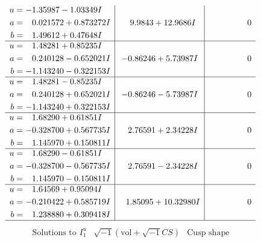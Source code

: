 \documentclass[1p]{elsarticle_modified}
\theoremstyle{definition}
\newcommand{\I}{\sqrt{-1}}
\begin{document}
$$\begin{array}{c|c|c}
\begin{aligned}
u &= -1.35987 - 1.03349 I \\
a &= \phantom{-}0.021572 + 0.873272 I \\
b &= \phantom{-}1.49612 + 0.47648 I\end{aligned}
 & \phantom{-}9.9843 + 12.9686 I & \phantom{-0.000000 } 0 \\ \hline\begin{aligned}
u &= \phantom{-}1.48281 + 0.85235 I \\
a &= \phantom{-}0.240128 - 0.652021 I \\
b &= -1.143240 - 0.322153 I\end{aligned}
 & -0.86246 + 5.73987 I & \phantom{-0.000000 } 0 \\ \hline\begin{aligned}
u &= \phantom{-}1.48281 - 0.85235 I \\
a &= \phantom{-}0.240128 + 0.652021 I \\
b &= -1.143240 + 0.322153 I\end{aligned}
 & -0.86246 - 5.73987 I & \phantom{-0.000000 } 0 \\ \hline\begin{aligned}
u &= \phantom{-}1.68290 + 0.61851 I \\
a &= -0.328700 + 0.567735 I \\
b &= \phantom{-}1.145970 + 0.150811 I\end{aligned}
 & \phantom{-}2.76591 + 2.34228 I & \phantom{-0.000000 } 0 \\ \hline\begin{aligned}
u &= \phantom{-}1.68290 - 0.61851 I \\
a &= -0.328700 - 0.567735 I \\
b &= \phantom{-}1.145970 - 0.150811 I\end{aligned}
 & \phantom{-}2.76591 - 2.34228 I & \phantom{-0.000000 } 0 \\ \hline\begin{aligned}
u &= \phantom{-}1.64569 + 0.95094 I \\
a &= -0.210422 + 0.585719 I \\
b &= \phantom{-}1.238880 + 0.309418 I\end{aligned}
 & \phantom{-}1.85095 + 10.32980 I & \phantom{-0.000000 } 0\\
 \hline 
 \end{array}$$\newpage$$\begin{array}{c|c|c}  
\text{Solutions to }I^u_{1}& \I (\text{vol} + \sqrt{-1}CS) & \text{Cusp shape}\\

\end{array}$$
\end{document}

